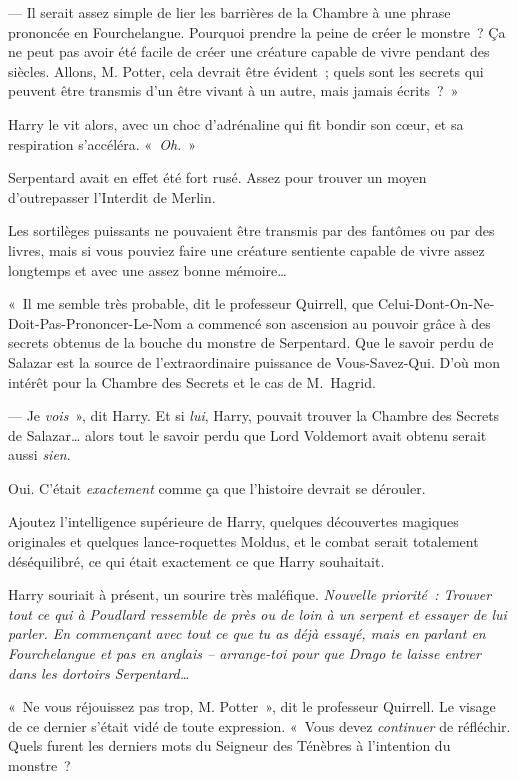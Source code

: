 --- Il serait assez simple de lier les barrières de la Chambre à une phrase prononcée en Fourchelangue. Pourquoi prendre la peine de créer le monstre~? Ça ne peut pas avoir été facile de créer une créature capable de vivre pendant des siècles. Allons, M. Potter, cela devrait être évident~; quels sont les secrets qui peuvent être transmis d'un être vivant à un autre, mais jamais écrits~?~»

Harry le vit alors, avec un choc d'adrénaline qui fit bondir son cœur, et sa respiration s'accéléra. «~\emph{Oh.}~»

Serpentard avait en effet été fort rusé. Assez pour trouver un moyen d'outrepasser l'Interdit de Merlin.

Les sortilèges puissants ne pouvaient être transmis par des fantômes ou par des livres, mais si vous pouviez faire une créature sentiente capable de vivre assez longtemps et avec une assez bonne mémoire…

«~Il me semble très probable, dit le professeur Quirrell, que Celui-Dont-On-Ne-Doit-Pas-Prononcer-Le-Nom a commencé son ascension au pouvoir grâce à des secrets obtenus de la bouche du monstre de Serpentard. Que le savoir perdu de Salazar est la source de l'extraordinaire puissance de Vous-Savez-Qui. D'où mon intérêt pour la Chambre des Secrets et le cas de M.~Hagrid.

--- Je \emph{vois}~», dit Harry. Et si \emph{lui}, Harry, pouvait trouver la Chambre des Secrets de Salazar… alors tout le savoir perdu que Lord Voldemort avait obtenu serait aussi \emph{sien}.

Oui. C'était \emph{exactement} comme ça que l'histoire devrait se dérouler.

Ajoutez l'intelligence supérieure de Harry, quelques découvertes magiques originales et quelques lance-roquettes Moldus, et le combat serait totalement déséquilibré, ce qui était exactement ce que Harry souhaitait.

Harry souriait à présent, un sourire très maléfique. \emph{Nouvelle priorité~: Trouver tout ce qui à Poudlard ressemble de près ou de loin à un serpent et essayer de lui parler. En commençant avec tout ce que tu as déjà essayé, mais en parlant en Fourchelangue et pas en anglais -- arrange-toi pour que Drago te laisse entrer dans les dortoirs Serpentard…}

«~Ne vous réjouissez pas trop, M. Potter~», dit le professeur Quirrell. Le visage de ce dernier s'était vidé de toute expression. «~Vous devez \emph{continuer} de réfléchir. Quels furent les derniers mots du Seigneur des Ténèbres à l'intention du monstre~?

